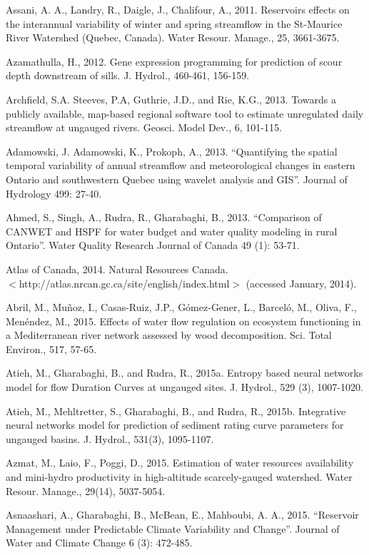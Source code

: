 \begin{hangingpar}{2em}
Assani, A. A., Landry, R., Daigle, J., Chalifour, A., 2011. Reservoirs effects on the interannual variability of winter and spring streamflow in the St-Maurice River Watershed (Quebec, Canada). Water Resour. Manage., 25, 3661-3675.

Azamathulla, H., 2012. Gene expression programming for prediction of scour depth downstream of sills. J. Hydrol., 460-461, 156-159. 

Archfield, S.A. Steeves, P.A, Guthrie, J.D., and Rie, K.G., 2013.  Towards a publicly available, map-based regional software tool to estimate unregulated daily streamflow at ungauged rivers. Geosci. Model Dev., 6, 101-115.

Adamowski, J. Adamowski, K., Prokoph, A., 2013. ``Quantifying the spatial temporal variability of annual streamflow and meteorological changes in eastern Ontario and southwestern Quebec using wavelet analysis and GIS''. Journal of Hydrology 499:  27-40.

Ahmed, S., Singh, A., Rudra, R., Gharabaghi, B., 2013. ``Comparison of CANWET and HSPF for water budget and water quality modeling in rural Ontario''.   Water Quality Research Journal of Canada 49 (1): 53-71.

Atlas of Canada, 2014. Natural Resources Canada. \\$<$http://atlas.nrcan.gc.ca/site/english/index.html$>$ (accessed January, 2014). 

Abril, M., Muñoz, I., Casas-Ruiz, J.P., Gómez-Gener, L., Barceló, M., Oliva, F., Menéndez, M., 2015. Effects of water flow regulation on ecosystem functioning in a Mediterranean river network assessed by wood decomposition. Sci. Total Environ., 517, 57-65.

Atieh, M., Gharabaghi, B., and Rudra, R., 2015a. Entropy based neural networks model for flow Duration Curves at ungauged sites. J. Hydrol., 529 (3), 1007-1020.

Atieh, M., Mehltretter, S., Gharabaghi, B., and  Rudra, R., 2015b. Integrative neural networks model for prediction of sediment rating curve parameters for ungauged basins. J. Hydrol.,  531(3), 1095-1107.

Azmat, M., Laio, F., Poggi, D., 2015. Estimation of water resources availability and mini-hydro productivity in high-altitude scarcely-gauged watershed. Water Resour. Manage., 29(14), 5037-5054.

Asnaashari, A., Gharabaghi, B., McBean, E., Mahboubi, A. A., 2015. ``Reservoir Management under Predictable Climate Variability and Change''.  Journal of Water and Climate Change 6 (3): 472-485.


\end{hangingpar}
